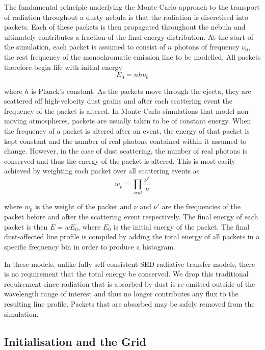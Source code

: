 The fundamental principle underlying the Monte Carlo approach to the transport of radiation throughout a dusty nebula is that the radiation is discretised into packets.  Each of these packets is then propagated throughout the nebula and ultimately contributes a fraction of the final energy distribution.  At the start of the simulation, each packet is assumed to consist of $n$ photons of frequency $\nu_0$, the rest frequency of the monochromatic emission line to be modelled.  All packets therefore begin life with initial energy
\begin{equation}
E_0=nh\nu_0
\end{equation}

where $h$ is Planck's constant.  As the packets move through the ejecta, they are scattered off high-velocity dust grains and after each scattering event the frequency of the packet is altered.  In Monte Carlo simulations that model non-moving atmospheres, packets are usually taken to be of constant energy.  When the frequency of a packet is altered after an event, the energy of that packet is kept constant and the number of real photons contained within it assumed to change.  However, in the case of dust scattering, the number of real photons is conserved and thus the energy of the packet is altered.  This is most easily achieved by weighting each packet over all scattering events as 
\begin{equation}
w_p=\prod_{scat} \frac{\nu'}{\nu}
\end{equation}

\noindent where $w_p$ is the weight of the packet and $\nu$ and $\nu'$ are 
the frequencies of the packet before and after the scattering event 
respectively.  The final energy of each packet is then $E =w E_0$, where $E_0$ is the initial energy of the packet.  The final dust-affected line profile is compiled by adding the total energy of all packets in a specific frequency bin in order to produce a histogram.

In these models, unlike fully self-consistent SED radiative transfer models, there is no requirement that the total energy be conserved.  We drop this traditional requirement since radiation that is absorbed by dust is re-emitted outside of the wavelength range of interest and thus no longer contributes any flux to the resulting line profile.  Packets that are absorbed may be safely removed from the simulation.

\subsection{Initialisation and the Grid}

